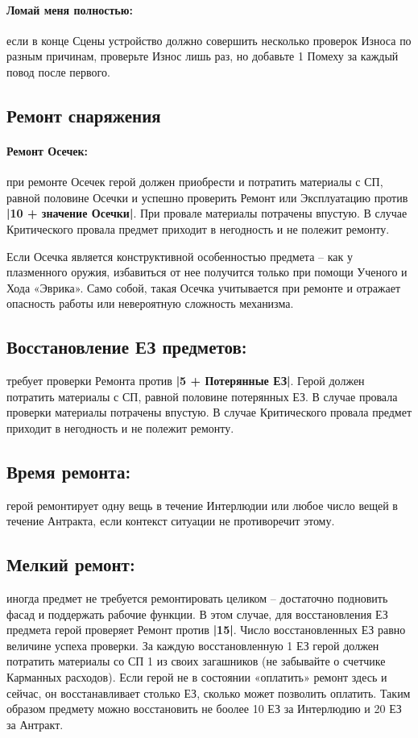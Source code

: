 \paragraph{Ломай меня полностью:} если в конце Сцены устройство должно совершить несколько проверок Износа по разным причинам, проверьте Износ лишь раз, но добавьте 1 Помеху за каждый повод после первого. 

\subsection{Ремонт снаряжения}
\paragraph{Ремонт Осечек:} при ремонте Осечек герой должен приобрести и потратить материалы с СП, равной половине Осечки и успешно проверить Ремонт или Эксплуатацию против \textbf{|10 + значение Осечки|}. При провале материалы потрачены впустую. В случае Критического провала предмет приходит в негодность и  не полежит ремонту. 
\begin{tcolorbox}
    Если Осечка является конструктивной особенностью предмета – как у плазменного оружия, избавиться от нее получится только при помощи Ученого и Хода «Эврика». Само собой, такая Осечка учитывается при ремонте и отражает опасность работы или невероятную сложность механизма.
\end{tcolorbox}

\subsection{Восстановление ЕЗ предметов:} требует проверки Ремонта против \textbf{|5 + Потерянные ЕЗ|}. Герой должен потратить материалы с СП, равной половине потерянных ЕЗ. В случае провала проверки материалы потрачены впустую. В случае Критического провала предмет приходит в негодность и не полежит ремонту.
\subsection{Время ремонта:} герой ремонтирует одну вещь в течение Интерлюдии или любое число вещей в течение Антракта, если контекст ситуации не противоречит этому. 

\subsection{Мелкий ремонт:} иногда предмет не требуется ремонтировать целиком – достаточно подновить фасад и поддержать рабочие функции. В этом случае, для восстановления ЕЗ предмета герой проверяет Ремонт против \textbf{|15|}. Число восстановленных ЕЗ равно величине успеха проверки. За каждую восстановленную 1 ЕЗ герой должен потратить материалы со СП 1 из своих загашников (не забывайте о счетчике Карманных расходов). Если герой не в состоянии «оплатить» ремонт здесь и сейчас, он восстанавливает столько ЕЗ, сколько может позволить оплатить. Таким образом предмету можно восстановить не боолее 10 ЕЗ за Интерлюдию и 20 ЕЗ за Антракт.
